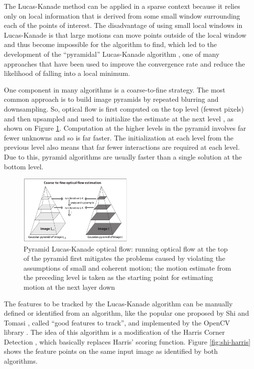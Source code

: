 \documentclass[msc, a4paper, classic, en]{ufbathesis}
\begin{document}
The Lucas-Kanade method can be applied in a sparse context because it relies only on local information that is derived from some small window surrounding each of the points of interest. The disadvantage of using small local windows in Lucas-Kanade is that large motions can move points outside of the local window and thus become impossible for the algorithm to find, which led to the development of the ``pyramidal'' Lucas-Kanade algorithm \cite{Bouguet00}, one of many approaches that have been used to improve the convergence rate and reduce the likelihood of falling into a local minimum.

One component in many algorithms is a coarse-to-fine strategy. The most common approach is to build image pyramids by repeated blurring and downsampling. So, optical flow is first computed on the top level (fewest pixels) and then upsampled and used to initialize the estimate at the next level \cite{dblk}, as shown on Figure \ref{fig:plk}. Computation at the higher levels in the pyramid involves far fewer unknowns and so is far faster. The initialization at each level from the previous level also means that far fewer interactions are required at each level. Due to this, pyramid algorithms are usually faster than a single solution at the bottom level.

\begin{figure}
\centering
\includegraphics[width=0.5\textwidth]{images/plk.png}
\caption{Pyramid Lucas-Kanade optical flow: running optical flow at the top of the pyramid first
\label{fig:plk}
mitigates the problems caused by violating the assumptions of small and coherent motion; the motion estimate from the preceding level is taken as the starting point for estimating motion at the next layer down \cite{bradski2008learning}}
\end{figure}

The features to be tracked by the Lucas-Kanade algorithm can be manually defined or identified from an algorithm, like the popular one proposed by Shi and Tomasi \cite{shi}, called ``good features to track'', and implemented by the OpenCV library \cite{opencv}. The idea of this algorithm is a modification of the Harris Corner Detection \cite{harris}, which basically replaces Harris' scoring function. Figure \ref{fig:shi-harris} shows the feature points on the same input image as identified by both algorithms.
\end{document}
